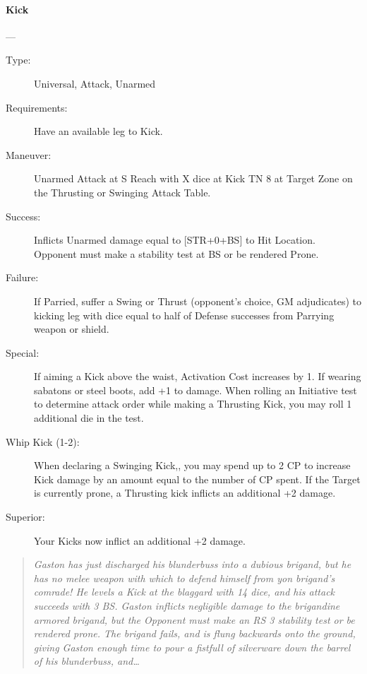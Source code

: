 \documentclass[oneside,11pt,english]{book}
\begin{document}
\paragraph{\large\label{man:Kick}Kick}---\quad{\large[X]}
\vspace{-10pt}\begin{description} 
\item [Type:] Universal, Attack, Unarmed 
\item [Requirements:] Have an available leg to Kick. 
\item [Maneuver:] Unarmed Attack at S Reach with X dice at Kick TN 8 at Target Zone on the Thrusting or 
Swinging Attack Table. 
\item [Success:] Inflicts Unarmed damage equal to [STR+0+BS] to Hit Location. Opponent must make a stability 
test at BS or be rendered Prone. 
\item [Failure:] If Parried, suffer a Swing or Thrust (opponent’s choice, GM adjudicates) to kicking leg with 
dice equal to half of Defense successes from Parrying weapon or shield. 
\item [Special:] If aiming a Kick above the waist, Activation Cost increases by 1. If wearing sabatons or steel 
boots, add +1 to damage. 
When rolling an Initiative test to determine attack order while making a Thrusting Kick, you may roll 1 
additional die in the test. 
\item [Whip Kick (1-2):] When declaring a Swinging Kick,, you may spend up to 2 CP to increase Kick damage 
by an amount equal to the number of CP spent. 
If the Target is currently prone, a Thrusting kick inflicts an additional +2 damage. 
\item [Superior:] Your Kicks now inflict an additional +2 damage. 
\end{description}
\begin{quotation}
\emph{Gaston has just discharged his blunderbuss into a dubious brigand, but he has no melee weapon with which to defend himself from yon brigand’s comrade! He levels a Kick at the blaggard with 14 dice, and his attack succeeds with 3 BS. Gaston inflicts negligible damage to the brigandine armored brigand, but the Opponent must make an RS 3 stability test or be rendered prone. The brigand fails, and is flung backwards onto the ground, giving Gaston enough time to pour a fistfull of silverware down the barrel of his blunderbuss, and\ldots}
\end{quotation}
\end{document}
